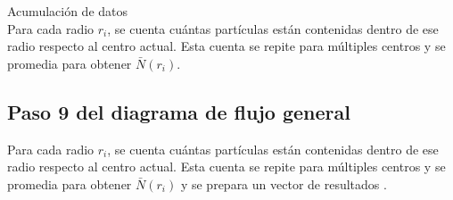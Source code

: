 	Acumulaci\'{o}n de datos\\
	Para cada radio \( r_i \), se cuenta cu\'{a}ntas part\'{i}culas est\'{a}n contenidas dentro de ese radio respecto al centro actual. Esta cuenta se repite para m\'{u}ltiples centros y se promedia para obtener \(\bar{N}(r_i)\).


	

 	
 	\subsection{Paso 9 del diagrama de flujo general}
 		

 	Para cada radio \( r_i \), se cuenta cu\'{a}ntas part\'{i}culas est\'{a}n contenidas dentro de ese radio respecto al centro actual. Esta cuenta se repite para m\'{u}ltiples centros y se promedia para obtener \( \bar{N}(r_i) \)	y se prepara un vector de resultados .
 
 
 	\clearpage
 
